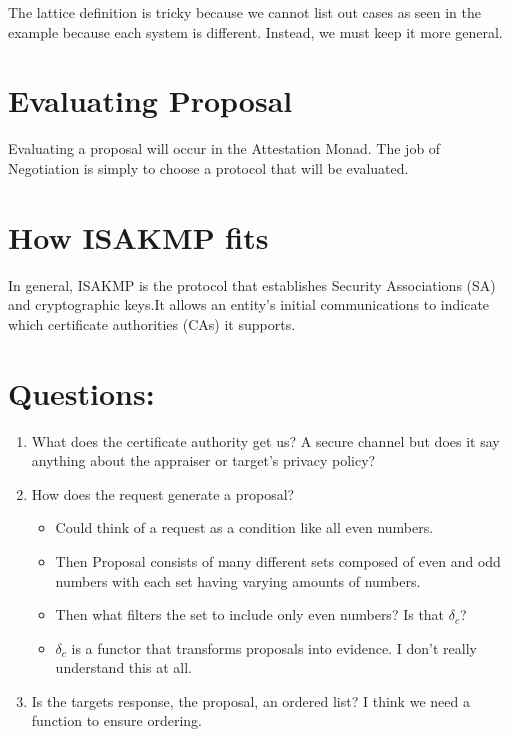 \documentclass[10pt]{article}
\begin{document}
	The lattice definition is tricky because we cannot list out cases as seen in the example because each system is different. Instead, we must keep it more general. 

\section {Evaluating Proposal}

Evaluating a proposal will occur in the Attestation Monad. The job of Negotiation is simply to choose a protocol that will be evaluated. 

\section {How ISAKMP fits} 

In general, ISAKMP is the protocol that establishes Security Associations (SA) and cryptographic keys.It allows an entity's initial communications to indicate which certificate authorities (CAs) it supports.   

\section {Questions:}
\begin{enumerate}
  \item What does the certificate authority get us? A secure channel but 
        does it say anything about the appraiser or target's
        privacy policy?
  \item How does the request generate a proposal? 
  \begin{itemize}
    \item Could think of a request as a condition like all even numbers.
    \item Then Proposal consists of many different sets composed of even
          and odd numbers with each set having varying amounts of numbers.
    \item Then what filters the set to include only even numbers?
          Is that $\delta_c$?
    \item $\delta_c$ is a functor that transforms proposals into evidence.
          I don't really understand this at all.  
  \end{itemize}
  \item Is the targets response, the proposal, an ordered list?
        I think we need a function to ensure ordering.
\end{enumerate}
\end{document}
